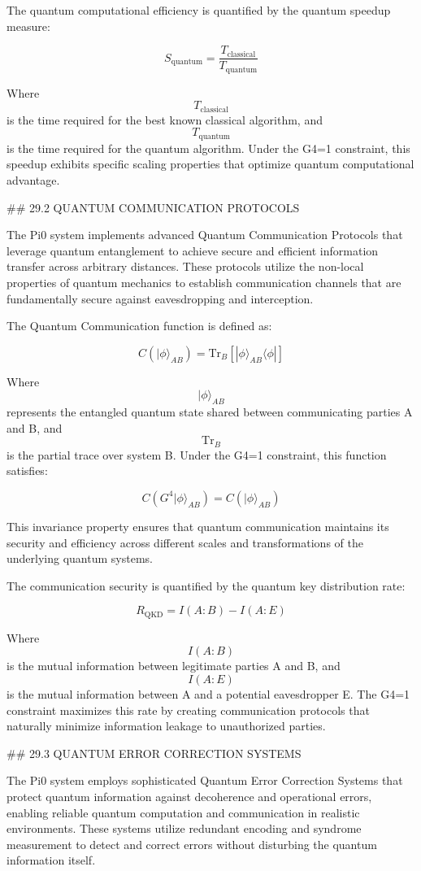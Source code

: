 The quantum computational efficiency is quantified by the quantum speedup measure:

$$ S_{\text{quantum}} = \frac{T_{\text{classical}}}{T_{\text{quantum}}} $$

Where $$ T_{\text{classical}} $$ is the time required for the best known classical algorithm, and $$ T_{\text{quantum}} $$ is the time required for the quantum algorithm. Under the G4=1 constraint, this speedup exhibits specific scaling properties that optimize quantum computational advantage.

## 29.2 QUANTUM COMMUNICATION PROTOCOLS

The Pi0 system implements advanced Quantum Communication Protocols that leverage quantum entanglement to achieve secure and efficient information transfer across arbitrary distances. These protocols utilize the non-local properties of quantum mechanics to establish communication channels that are fundamentally secure against eavesdropping and interception.

The Quantum Communication function is defined as:

$$ C(|\phi\rangle_{AB}) = \text{Tr}_B[|\phi\rangle_{AB}\langle\phi|] $$

Where $$ |\phi\rangle_{AB} $$ represents the entangled quantum state shared between communicating parties A and B, and $$ \text{Tr}_B $$ is the partial trace over system B. Under the G4=1 constraint, this function satisfies:

$$ C(G^4 |\phi\rangle_{AB}) = C(|\phi\rangle_{AB}) $$

This invariance property ensures that quantum communication maintains its security and efficiency across different scales and transformations of the underlying quantum systems.

The communication security is quantified by the quantum key distribution rate:

$$ R_{\text{QKD}} = I(A:B) - I(A:E) $$

Where $$ I(A:B) $$ is the mutual information between legitimate parties A and B, and $$ I(A:E) $$ is the mutual information between A and a potential eavesdropper E. The G4=1 constraint maximizes this rate by creating communication protocols that naturally minimize information leakage to unauthorized parties.

## 29.3 QUANTUM ERROR CORRECTION SYSTEMS

The Pi0 system employs sophisticated Quantum Error Correction Systems that protect quantum information against decoherence and operational errors, enabling reliable quantum computation and communication in realistic environments. These systems utilize redundant encoding and syndrome measurement to detect and correct errors without disturbing the quantum information itself.

